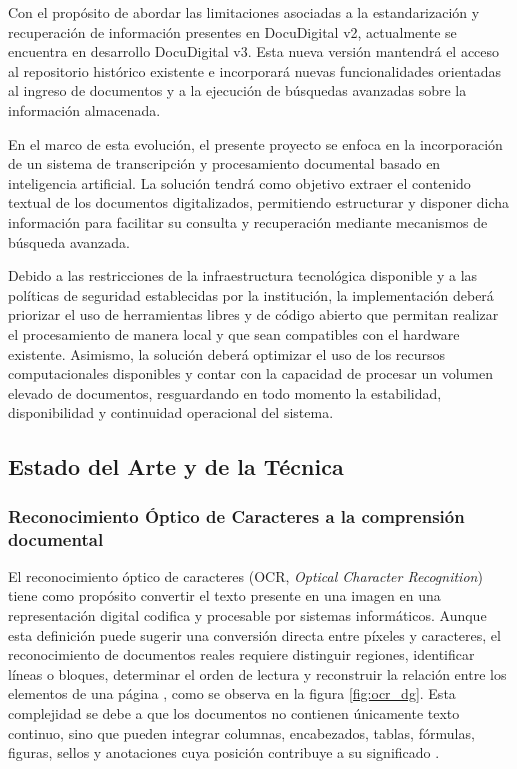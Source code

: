 Con el propósito de abordar las limitaciones asociadas a la estandarización y recuperación de información presentes en DocuDigital v2, actualmente se encuentra en desarrollo DocuDigital v3. Esta nueva versión mantendrá el acceso al repositorio histórico existente e incorporará nuevas funcionalidades orientadas al ingreso de documentos y a la ejecución de búsquedas avanzadas sobre la información almacenada.

En el marco de esta evolución, el presente proyecto se enfoca en la incorporación de un sistema de transcripción y procesamiento documental basado en inteligencia artificial. La solución tendrá como objetivo extraer el contenido textual de los documentos digitalizados, permitiendo estructurar y disponer dicha información para facilitar su consulta y recuperación mediante mecanismos de búsqueda avanzada.

Debido a las restricciones de la infraestructura tecnológica disponible y a las políticas de seguridad establecidas por la institución, la implementación deberá priorizar el uso de herramientas libres y de código abierto que permitan realizar el procesamiento de manera local y que sean compatibles con el hardware existente. Asimismo, la solución deberá optimizar el uso de los recursos computacionales disponibles y contar con la capacidad de procesar un volumen elevado de documentos, resguardando en todo momento la estabilidad, disponibilidad y continuidad operacional del sistema.

\subsection{Estado del Arte y de la Técnica}

\subsubsection{Reconocimiento Óptico de Caracteres a la comprensión documental}

El reconocimiento óptico de caracteres (OCR, \textit{Optical Character Recognition}) tiene como propósito convertir el texto presente en una imagen en una representación digital codifica y procesable por sistemas informáticos. Aunque esta definición puede sugerir una conversión directa entre píxeles y caracteres, el reconocimiento de documentos reales requiere distinguir regiones, identificar líneas o bloques, determinar el orden de lectura y reconstruir la relación entre los elementos de una página \cite{afkari2025transformers}, como se observa en la figura \ref{fig:ocr_dg}. Esta complejidad se debe a que los documentos no contienen únicamente texto continuo, sino que pueden integrar columnas, encabezados, tablas, fórmulas, figuras, sellos y anotaciones cuya posición contribuye a su significado \cite{subramani2021document}.

